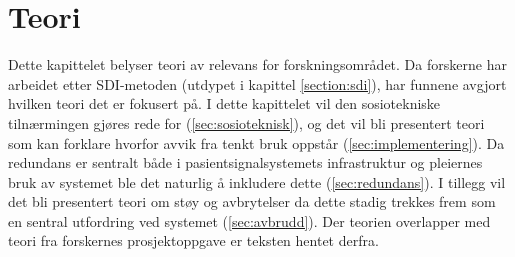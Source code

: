 \chapter{Teori}
\label{chp:teori} 
Dette kapittelet belyser teori av relevans for forskningsområdet. Da forskerne har arbeidet etter SDI-metoden (utdypet i kapittel \ref{section:sdi}), har funnene avgjort hvilken teori det er fokusert på. I dette kapittelet vil den sosiotekniske tilnærmingen gjøres rede for (\ref{sec:sosioteknisk}), og det vil bli presentert teori som kan forklare hvorfor avvik fra tenkt bruk oppstår (\ref{sec:implementering}). Da redundans er sentralt både i pasientsignalsystemets infrastruktur og pleiernes bruk av systemet ble det naturlig å inkludere dette (\ref{sec:redundans}). I tillegg vil det bli presentert teori om støy og avbrytelser da dette stadig trekkes frem som en sentral utfordring ved systemet (\ref{sec:avbrudd}). Der teorien overlapper med teori fra forskernes prosjektoppgave \citep{Sund13} er teksten hentet derfra. 



